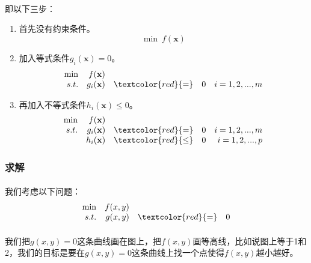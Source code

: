 			\paragraph{}即以下三步：
			\begin{enumerate}
				\item 首先没有约束条件。
					 \[
  					     \min\ f( \mathbf{x} )
  					 \] 
				\item 加入等式条件$g_i(\bm{x}) = 0$。
					\[
					\begin{array}{rrrrrrrrl}
 						\min & f( \mathbf{x})  &  & & \\
 						s.t. & g_i( \mathbf{x}) & \textcolor{red}{\bf =} &0 & i=1,2,..., m \\
					\end{array} \nonumber
					\]
				\item 再加入不等式条件$h_i(\bm{x}) \leq 0$。
					\[
					\begin{array}{rrrrrrrrl}
 						\min & f( \mathbf{x})  &  & & \\
 						s.t. & g_i( \mathbf{x}) & \textcolor{red}{\bf =} &0  & i=1,2,..., m \\
       					& h_i( \mathbf{x}) & \textcolor{red}{\bf \leq} &0  & i=1,2,..., p 
					\end{array} \nonumber
					\]
			\end{enumerate}
		\subsubsection{求解}
			\paragraph{}我们考虑以下问题：
				\[
				\begin{array}{rrrrrrrrl}
 					\min & f(x,y)  &   &\\
 					s.t. & g(x,y)  & \textcolor{red}{\bf =} & 0
				\end{array} \nonumber
				\]
			\paragraph{}我们把$g(x,y) = 0$这条曲线画在图上，把$f(x,y)$画等高线，比如说图上等于1和2，我们的目标是要在$g(x,y) = 0$这条曲线上找一个点使得$f(x,y)$越小越好。
			

